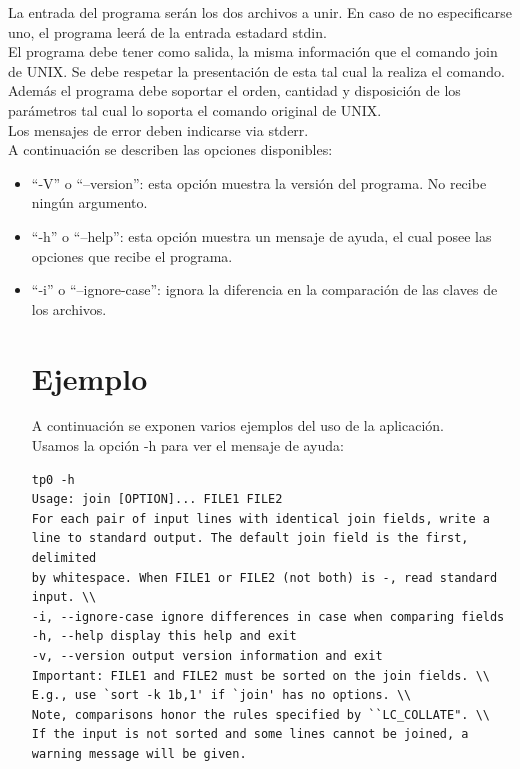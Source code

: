 \documentclass[a4paper,11pt]{article}
\begin{document}
La entrada del programa ser\'an los dos archivos a unir. En caso de no especificarse uno, el programa leer\'a de la entrada estadard stdin. \\
El programa debe tener como salida, la misma informaci\'on que el comando join de UNIX. Se debe respetar la presentaci\'on de esta tal cual la realiza el comando. Adem\'as el programa debe soportar el orden, cantidad y disposici\'on de los par\'ametros tal cual lo soporta el comando original de UNIX.  \\
Los mensajes de error deben indicarse via stderr. \\
A continuaci\'on se describen las opciones disponibles:

\begin{itemize}
\item	``-V'' o ``--version'': esta opci\'on muestra la versi\'on del programa. No recibe ning\'un argumento.

\item	``-h'' o ``--help'': esta opci\'on muestra un mensaje de ayuda, el cual posee las opciones que recibe el programa.

\item	``-i'' o ``--ignore-case'': ignora la diferencia en la comparaci\'on de las claves de los archivos.

\newpage
\section{Ejemplo}


A continuaci\'on se exponen varios ejemplos del uso de la aplicaci\'on. \\

Usamos la opci\'on -h para ver el mensaje de ayuda:
\begin{verbatim}
tp0 -h
Usage: join [OPTION]... FILE1 FILE2
For each pair of input lines with identical join fields, write a line to standard output. The default join field is the first, delimited
by whitespace. When FILE1 or FILE2 (not both) is -, read standard input. \\
-i, --ignore-case ignore differences in case when comparing fields
-h, --help display this help and exit
-v, --version output version information and exit
Important: FILE1 and FILE2 must be sorted on the join fields. \\
E.g., use `sort -k 1b,1' if `join' has no options. \\
Note, comparisons honor the rules specified by ``LC_COLLATE". \\
If the input is not sorted and some lines cannot be joined, a warning message will be given.


\end{verbatim}
\end{itemize}
\end{document}
